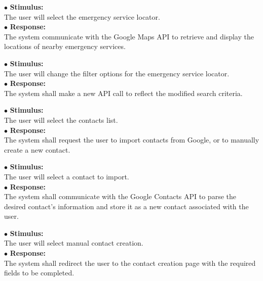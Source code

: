 \documentclass{scrreprt}
\begin{document}
\vspace{5mm}
	\hspace{-4.75mm} $\bullet$ \textbf{Stimulus:} \\ \hspace{5mm} The user will select the emergency service locator.\\
	$\bullet$ \textbf{Response:} \\ \hspace{5mm} The system communicate with the Google Maps API to retrieve and display the locations of nearby emergency services.

\vspace{5mm}
	\hspace{-4.75mm} $\bullet$ \textbf{Stimulus:} \\ \hspace{5mm} The user will change the filter options for the emergency service locator.\\
	$\bullet$ \textbf{Response:} \\ \hspace{5mm} The system shall make a new API call to reflect the modified search criteria.

\vspace{5mm}
	\hspace{-4.75mm} $\bullet$ \textbf{Stimulus:} \\ \hspace{5mm} The user will select the contacts list.\\
	$\bullet$ \textbf{Response:} \\ \hspace{5mm} The system shall request the user to import contacts from Google, or to manually create a new contact.
\newpage

\vspace{5mm}
	\hspace{-4.75mm} $\bullet$ \textbf{Stimulus:} \\ \hspace{5mm} The user will select a contact to import.\\
	$\bullet$ \textbf{Response:} \\ \hspace{5mm} The system shall communicate with the Google Contacts API to parse the desired contact's information and store it as a new contact associated with the user.

\vspace{5mm}
	\hspace{-4.75mm} $\bullet$ \textbf{Stimulus:} \\ \hspace{5mm} The user will select manual contact creation.\\
	$\bullet$ \textbf{Response:} \\ \hspace{5mm} The system shall redirect the user to the contact creation page with the required fields to be completed.
\end{document}
